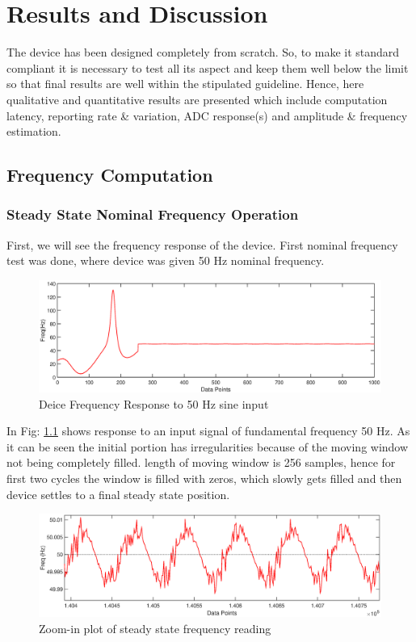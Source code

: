 \chapter{Results and Discussion}
The device has been designed completely from scratch. So, to make it standard compliant it is necessary to test all its aspect and keep them well below the limit so that final results are well within the stipulated guideline. Hence, here qualitative and quantitative results are presented which include computation latency, reporting rate \& variation, ADC response(s) and amplitude \& frequency estimation.

\section{Frequency Computation}
\subsection{Steady State Nominal Frequency Operation}
First, we will see the frequency response of the device. First nominal frequency test was done, where device was given 50 Hz nominal frequency.
\begin{figure}[h]
	\includegraphics[width=\textwidth]{fig/50Hz_freq_1000samples.eps}
	\caption{Deice Frequency Response to 50 Hz sine input}
	\label{fig:50hzlongdata}
\end{figure}

In Fig: \ref{fig:50hzlongdata} shows response to an input signal of fundamental frequency 50 Hz. As it can be seen the initial portion has irregularities because of the moving window not being completely filled. length of moving window is 256 samples, hence for first two cycles the window is filled with zeros, which slowly gets filled and then device settles to a final steady state position.

\begin{figure}[h]
	\includegraphics[width=\textwidth]{fig/50Hz_freq_closeup.eps}
	\caption{Zoom-in plot of steady state frequency reading}
	\label{fig:50Hzcloseup}
\end{figure}


